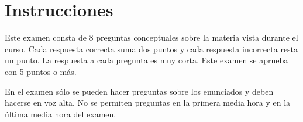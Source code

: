 
\section*{Instrucciones}

Este examen consta de 8 preguntas conceptuales sobre la materia vista durante el curso. Cada respuesta correcta suma dos puntos y cada respuesta incorrecta resta un punto. La respuesta a cada pregunta es muy corta.
Este examen se aprueba con 5 puntos o más.

En el examen sólo se pueden hacer preguntas sobre los enunciados y deben hacerse en voz alta. No se permiten preguntas en la primera media hora y en la última media hora del examen.
